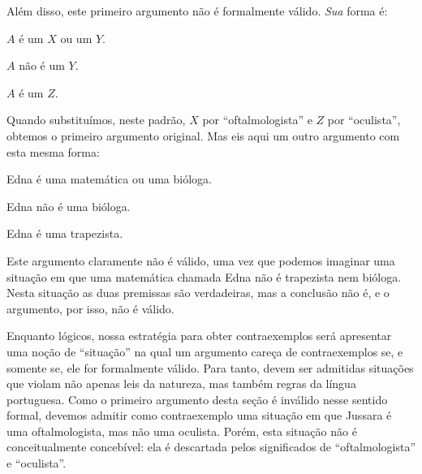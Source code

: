 Além disso, este primeiro argumento não é formalmente válido. \emph{Sua} forma é:
\begin{earg}
	\item[] $A$ é um $X$ ou um $Y$.
	\item[] $A$ não é um $Y$.
	\item[\therefore] $A$ é um $Z$.
\end{earg}
Quando substituímos, neste padrão, $X$ por ``oftalmologista'' e $Z$ por ``oculista'', obtemos o primeiro argumento original.
Mas eis aqui um outro argumento com esta mesma forma:
\begin{earg}
	\item[] Edna é uma matemática ou uma bióloga.
	\item[] Edna não é uma bióloga.
	\item[\therefore] Edna é uma trapezista.
\end{earg}
Este argumento claramente não é válido, uma vez que podemos imaginar uma situação em que uma matemática chamada Edna  não é  trapezista nem  bióloga.
Nesta situação as duas premissas são verdadeiras, mas a conclusão não é, e o argumento, por isso, não é válido.

Enquanto lógicos, nossa estratégia para obter contraexemplos será apresentar uma noção de ``situação'' na qual um argumento careça de contraexemplos se, e somente se, ele for formalmente válido.
Para tanto, devem ser admitidas situações que violam não apenas leis da natureza, mas também regras da língua portuguesa.
Como o primeiro argumento desta seção é inválido nesse sentido formal, devemos admitir como contraexemplo uma situação em que Jussara é uma oftalmologista, mas não uma oculista.
Porém, esta situação não é conceitualmente concebível: ela é descartada pelos significados de ``oftalmologista'' e ``oculista''.

